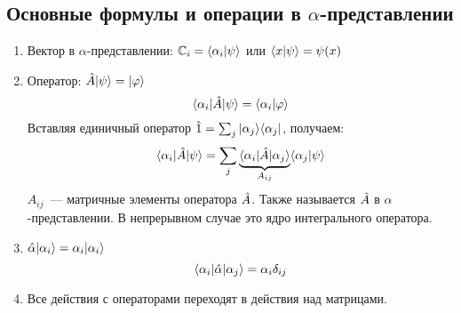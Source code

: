 \subsection{Основные формулы и операции в $\alpha$-представлении}
\begin{enumerate}
  \item Вектор в $\alpha$-представлении: $\mathbb {C}_i = \langle \alpha_i | \psi \rangle$ или $\langle x | \psi \rangle = \psi(x)$
  \item Оператор: $\Hat A | \psi \rangle = | \varphi \rangle$
  $$
    { \langle \alpha_i |\Hat A| \psi \rangle } = \langle \alpha_i | \varphi \rangle
  $$
  Вставляя единичный оператор $\Hat 1 = \sum_j | \alpha_j \rangle\langle \alpha_j |$, получаем:
  $$
        { \langle \alpha_i |\Hat A| \psi \rangle } = \sum_j \underbrace{{ \langle \alpha_i |\Hat A| \alpha_j \rangle }}_{A_{ij}} \langle \alpha_j | \psi \rangle
  $$
  $A_{ij}$~--- матричные элементы оператора $\Hat A$. Также называется $\Hat A$ в $\alpha$-представлении.
  В непрерывном случае это ядро интегрального оператора.
  \item $\Hat \alpha | \alpha_i \rangle = \alpha_i | \alpha_i \rangle$
  $$
    { \langle \alpha_i |\Hat \alpha| \alpha_j \rangle } = \alpha_i \delta_{ij}
  $$
  \item Все действия с операторами переходят в действия над матрицами.
\end{enumerate}
